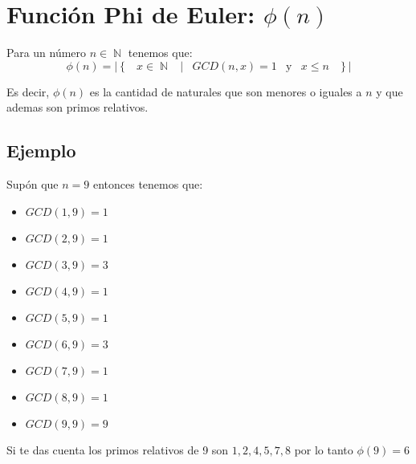 \documentclass[12pt, fleqn]{report}                             %
\DeclareMathOperator \Space {\quad}                             %
\DeclareMathOperator \MiniSpace {\;}                            %
\newcommand \Such {\MiniSpace|\MiniSpace}                       %
\newcommand \Also {\MiniSpace \text{y} \MiniSpace}              %
\newcommand{\Set}[1]{\left\{ \MiniSpace #1 \MiniSpace \right\}} %
\DeclareMathOperator \Naturals  {\mathbb{N}}                     %
\begin{document}
    \clearpage
    \section{Función Phi de Euler: $\phi(n)$}

        Para un número $n \in \Naturals$ tenemos que:
        \begin{equation}
            \phi(n) = 
                | \Set{ x \in \Naturals \Such GCD(n, x) = 1 \Also x \leq n } |
        \end{equation}
 
        Es decir, $\phi(n)$ es la cantidad de naturales que son menores o iguales a
        $n$ y que ademas son primos relativos.


        \subsection{Ejemplo}
            
            Supón que $n=9$ entonces tenemos que:

            \begin{itemize}
                \item $GCD(1, 9) = 1$
                \item $GCD(2, 9) = 1$
                \item $GCD(3, 9) = 3$
                \item $GCD(4, 9) = 1$
                \item $GCD(5, 9) = 1$
                \item $GCD(6, 9) = 3$
                \item $GCD(7, 9) = 1$
                \item $GCD(8, 9) = 1$
                \item $GCD(9, 9) = 9$
            \end{itemize}

            Si te das cuenta los primos relativos de 9 son $1,2,4,5,7,8$
            por lo tanto $\phi(9) = 6$





        \clearpage
\end{document}
